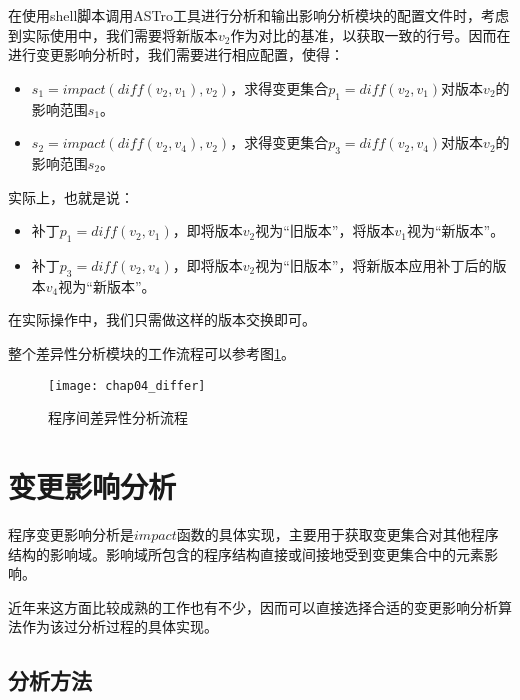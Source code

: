 在使用shell脚本调用ASTro工具进行分析和输出影响分析模块的配置文件时，考虑到实际使用中，我们需要将新版本$v_2$作为对比的基准，以获取一致的行号。因而在进行变更影响分析时，我们需要进行相应配置，使得：
\begin{itemize}
	\item $s_1 = impact(diff(v_2,v_1),v_2)$，求得变更集合$p_1 = diff(v_2,v_1)$对版本$v_2$的影响范围$s_1$。
	\item $s_2 = impact(diff(v_2,v_4),v_2)$，求得变更集合$p_3 = diff(v_2,v_4)$对版本$v_2$的影响范围$s_2$。
\end{itemize}

实际上，也就是说：
\begin{itemize}
	\item 补丁$p_1 = diff(v_2,v_1)$，即将版本$v_2$视为“旧版本”，将版本$v_1$视为“新版本”。
	\item 补丁$p_3 = diff(v_2,v_4)$，即将版本$v_2$视为“旧版本”，将新版本应用补丁后的版本$v_4$视为“新版本”。
\end{itemize}

在实际操作中，我们只需做这样的版本交换即可。

整个差异性分析模块的工作流程可以参考图\ref {diff}。

\begin{figure}[H]
	\centering
	\texttt{[image: chap04\_differ]}
	\caption {程序间差异性分析流程}
	\label {diff}	
\end{figure}






\section{变更影响分析}
\label {chap_impact}

程序变更影响分析是$impact$函数的具体实现，主要用于获取变更集合对其他程序结构的影响域。影响域所包含的程序结构直接或间接地受到变更集合中的元素影响。

近年来这方面比较成熟的工作也有不少，因而可以直接选择合适的变更影响分析算法作为该过分析过程的具体实现。

\subsection{分析方法}

